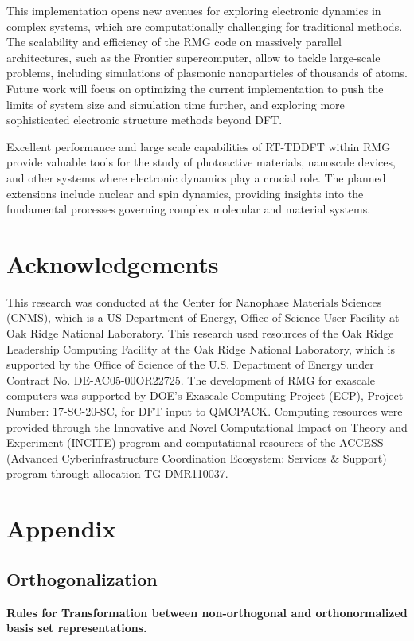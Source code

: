 \documentclass[journal=jctcce,manuscript=article,etalmode=truncate,maxauthors=10,layout=twocolumn,9pt]{achemso}   %
\begin{document}
This implementation  opens new avenues for exploring electronic dynamics in complex systems, which are   computationally challenging for traditional methods. The scalability and efficiency of the RMG code on massively parallel architectures, such as the Frontier supercomputer, allow to tackle large-scale problems, including simulations of plasmonic nanoparticles of  thousands of atoms. Future work will focus on optimizing the current implementation to push the limits of system size and simulation time further, and exploring more sophisticated electronic structure methods beyond DFT.

Excellent performance and large scale capabilities of RT-TDDFT within RMG  provide  valuable tools for the study of photoactive materials, nanoscale devices, and other systems where electronic dynamics play a crucial role. The planned extensions include nuclear and spin dynamics, providing  insights into the fundamental processes governing complex molecular and material systems.





\section{Acknowledgements}

This research was conducted at the Center for Nanophase Materials Sciences (CNMS), 
which is a US Department of Energy, Office of Science User Facility at Oak Ridge National Laboratory.
This research used resources of the Oak Ridge Leadership Computing Facility at the Oak Ridge National Laboratory, 
which is supported by the Office of Science of the U.S. Department of Energy under Contract No. DE-AC05-00OR22725. The development of RMG for exascale computers was supported by DOE's Exascale Computing Project (ECP), Project Number: 17-SC-20-SC, for DFT input to QMCPACK. Computing resources were provided through  the Innovative and Novel Computational Impact on Theory and Experiment (INCITE) program
and computational resources of the ACCESS (Advanced Cyberinfrastructure Coordination Ecosystem: Services \& Support) program through allocation TG-DMR110037. 

\appendix

\section{Appendix} 
\subsection{Orthogonalization} 
{ \bf Rules for Transformation  between non-orthogonal and orthonormalized basis  set representations.}
\end{document}
